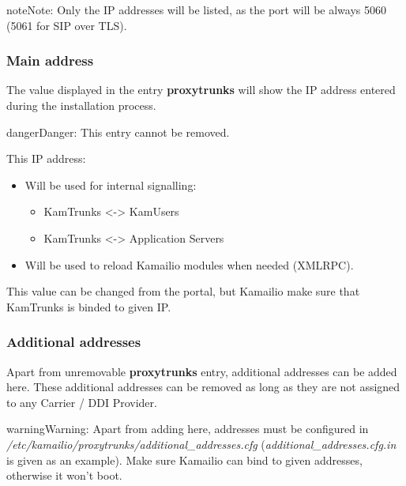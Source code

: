 \documentclass[letterpaper,10pt,english]{sphinxmanual}
\begin{document}
\begin{notice}{note}{Note:}
Only the IP addresses will be listed, as the port will be always 5060
(5061 for SIP over TLS).
\end{notice}


\subsubsection{Main address}
\label{administration_portal/platform/infrastructure/proxy_trunks:main-address}
The value displayed in the entry \textbf{proxytrunks} will show the IP address
entered during the installation process.

\begin{notice}{danger}{Danger:}
This entry cannot be removed.
\end{notice}

This IP address:
\begin{itemize}
\item {} 
Will be used for internal signalling:
\begin{itemize}
\item {} 
KamTrunks \textless{}-\textgreater{} KamUsers

\item {} 
KamTrunks \textless{}-\textgreater{} Application Servers

\end{itemize}

\item {} 
Will be used to reload Kamailio modules when needed (XMLRPC).

\end{itemize}

This value can be changed from the portal, but Kamailio make sure that KamTrunks is binded to given IP.


\subsubsection{Additional addresses}
\label{administration_portal/platform/infrastructure/proxy_trunks:additional-addresses}
Apart from unremovable \textbf{proxytrunks} entry, additional addresses can be added here. These additional addresses can be
removed as long as they are not assigned to any Carrier / DDI Provider.

\begin{notice}{warning}{Warning:}
Apart from adding here, addresses must be configured in \emph{/etc/kamailio/proxytrunks/additional\_addresses.cfg}
(\emph{additional\_addresses.cfg.in} is given as an example). Make sure Kamailio can bind to given addresses,
otherwise it won't boot.
\end{notice}
\end{document}
